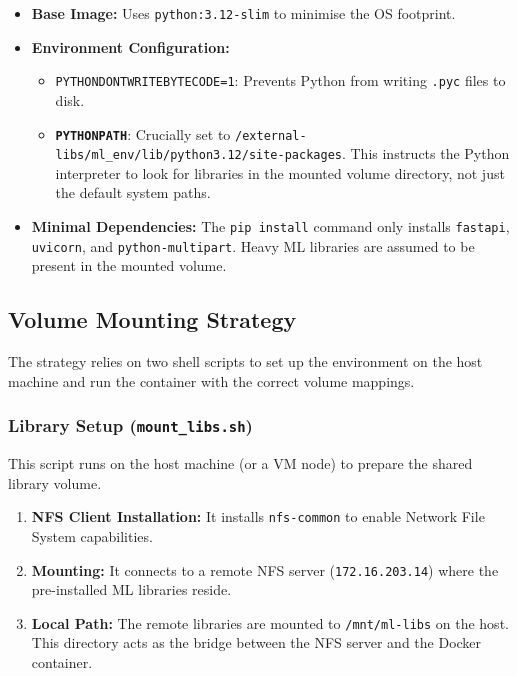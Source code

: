 \documentclass[11pt,a4paper]{article}
\begin{document}
\begin{itemize}
    \item \textbf{Base Image:} Uses \texttt{python:3.12-slim} to minimise the OS footprint.
    \item \textbf{Environment Configuration:} 
    \begin{itemize}
        \item \texttt{PYTHONDONTWRITEBYTECODE=1}: Prevents Python from writing \texttt{.pyc} files to disk.
        \item \textbf{\texttt{PYTHONPATH}}: Crucially set to \texttt{/external-libs/ml\_env/lib/python3.12/site-packages}. This instructs the Python interpreter to look for libraries in the mounted volume directory, not just the default system paths.
    \end{itemize}
    \item \textbf{Minimal Dependencies:} The \texttt{pip install} command only installs \texttt{fastapi}, \texttt{uvicorn}, and \texttt{python-multipart}. Heavy ML libraries are assumed to be present in the mounted volume.
\end{itemize}

\subsection{Volume Mounting Strategy}

The strategy relies on two shell scripts to set up the environment on the host machine and run the container with the correct volume mappings.

\subsubsection{Library Setup (\texttt{mount\_libs.sh})}
This script runs on the host machine (or a VM node) to prepare the shared library volume.
\begin{enumerate}
    \item \textbf{NFS Client Installation:} It installs \texttt{nfs-common} to enable Network File System capabilities.
    \item \textbf{Mounting:} It connects to a remote NFS server (\texttt{172.16.203.14}) where the pre-installed ML libraries reside.
    \item \textbf{Local Path:} The remote libraries are mounted to \texttt{/mnt/ml-libs} on the host. This directory acts as the bridge between the NFS server and the Docker container.
\end{enumerate}
\end{document}
